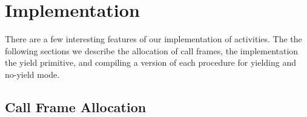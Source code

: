 \documentclass[9pt,preprint]{sigplanconf-2}
\begin{document}




\section{Implementation}

There are a few interesting features of our implementation of activities.
The the following sections we describe the allocation of call frames, the implementation the yield primitive, and compiling a version of each procedure for yielding and no-yield mode.

\subsection{Call Frame Allocation}
\end{document}

